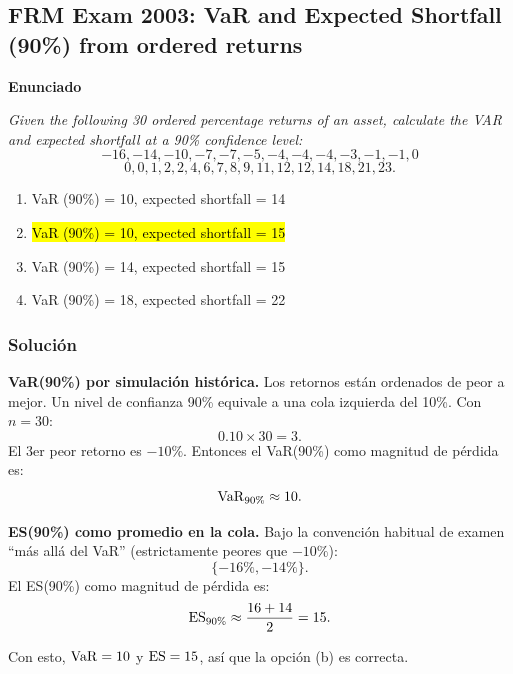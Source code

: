 ﻿\subsection{FRM Exam 2003: VaR and Expected Shortfall (90\%) from ordered returns}

\textbf{Enunciado}

\emph{Given the following 30 ordered percentage returns of an asset, calculate the VAR and expected shortfall at a 90\% confidence level:}
\[
-16,-14,-10,-7,-7,-5,-4,-4,-4,-3,-1,-1,0
\]
\[
0,0,1,2,2,4,6,7,8,9,11,12,12,14,18,21,23.
\]
\begin{enumerate}[label=\alph*.]
\item VaR (90\%) = 10, expected shortfall = 14
\item \hl{VaR (90\%) = 10, expected shortfall = 15}
\item VaR (90\%) = 14, expected shortfall = 15
\item VaR (90\%) = 18, expected shortfall = 22
\end{enumerate}

\subsubsection*{Solución}


\textbf{VaR(90\%) por simulación histórica.} Los retornos están ordenados de peor a mejor. Un nivel de confianza 90\% equivale a una cola izquierda del 10\%.
Con \(n=30\):
\[
0.10\times 30=3.
\]
El 3er peor retorno es \(-10\%\). Entonces el VaR(90\%) como magnitud de pérdida es:
\[
\mathrm{VaR}_{90\%}\approx 10.
\]

\textbf{ES(90\%) como promedio en la cola.} Bajo la convención habitual de examen ``más allá del VaR'' (estrictamente peores que \(-10\%\)):
\[
\{-16\%,-14\%\}.
\]
El ES(90\%) como magnitud de pérdida es:
\[
\mathrm{ES}_{90\%}\approx \frac{16+14}{2}=15.
\]


Con esto, \(\mathrm{VaR}=10\) y \(\mathrm{ES}=15\), así que la opción (b) es correcta.












